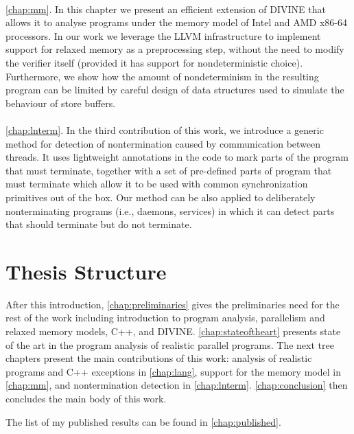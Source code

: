 \paragraph{}
\autoref{chap:mm}.
In this chapter we present an efficient extension of DIVINE that allows it to
analyse programs under the memory model of Intel and AMD x86-64 processors.
In our work we leverage the LLVM infrastructure to implement support for
relaxed memory as a preprocessing step, without the need to modify the verifier
itself (provided it has support for nondeterministic choice).
Furthermore, we show how the amount of nondeterminism in the resulting program
can be limited by careful design of data structures used to simulate the
behaviour of \xtso store buffers.

\paragraph{}
\autoref{chap:lnterm}.
In the third contribution of this work, we introduce a generic method for
detection of nontermination caused by communication between threads.
It uses lightweight annotations in the code to mark parts of the program that
must terminate, together with a set of pre-defined parts of program that must
terminate which allow it to be used with common synchronization primitives out
of the box.
Our method can be also applied to deliberately nonterminating programs (i.e.,
daemons, services) in which it can detect parts that should terminate but do
not terminate.

\section{Thesis Structure}

After this introduction, \autoref{chap:preliminaries} gives the preliminaries
need for the rest of the work including introduction to program analysis, parallelism and relaxed memory models, C++, and DIVINE.
\autoref{chap:stateoftheart} presents state of the art in the program analysis
of realistic parallel programs.
The next tree chapters present the main contributions of this work: analysis of
realistic programs and C++ exceptions in \autoref{chap:lang}, support for the
\xtso memory model in \autoref{chap:mm}, and nontermination detection in
\autoref{chap:lnterm}.
\autoref{chap:conclusion} then concludes the main body of this work.

The list of my published results can be found in \autoref{chap:published}.

